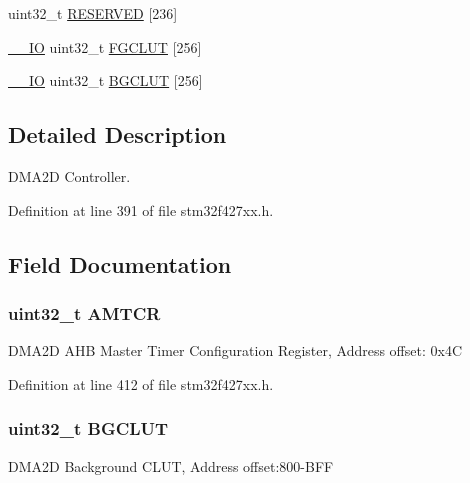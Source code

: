 \begin{DoxyCompactItemize}
\item 
uint32\+\_\+t \hyperlink{struct_d_m_a2_d___type_def_a76f04b864709f67a7c16434b41ec7ea8}{R\+E\+S\+E\+R\+V\+ED} \mbox{[}236\mbox{]}
\item 
\hyperlink{core__sc300_8h_aec43007d9998a0a0e01faede4133d6be}{\+\_\+\+\_\+\+IO} uint32\+\_\+t \hyperlink{struct_d_m_a2_d___type_def_aa263c42ff3097bde6c0d4061ac0d8e43}{F\+G\+C\+L\+UT} \mbox{[}256\mbox{]}
\item 
\hyperlink{core__sc300_8h_aec43007d9998a0a0e01faede4133d6be}{\+\_\+\+\_\+\+IO} uint32\+\_\+t \hyperlink{struct_d_m_a2_d___type_def_aa30a12d8e79ac9d4ff173a8dd6135b3c}{B\+G\+C\+L\+UT} \mbox{[}256\mbox{]}
\end{DoxyCompactItemize}


\subsection{Detailed Description}
D\+M\+A2D Controller. 

Definition at line 391 of file stm32f427xx.\+h.



\subsection{Field Documentation}
\subsubsection[{\texorpdfstring{A\+M\+T\+CR}{AMTCR}}]{ uint32\+\_\+t A\+M\+T\+CR}\hypertarget{struct_d_m_a2_d___type_def_a9f16d1904f085dbd51466994f01bd9e2}{}\label{struct_d_m_a2_d___type_def_a9f16d1904f085dbd51466994f01bd9e2}
D\+M\+A2D A\+HB Master Timer Configuration Register, Address offset\+: 0x4C 

Definition at line 412 of file stm32f427xx.\+h.

\subsubsection[{\texorpdfstring{B\+G\+C\+L\+UT}{BGCLUT}}]{ uint32\+\_\+t B\+G\+C\+L\+UT}\hypertarget{struct_d_m_a2_d___type_def_aa30a12d8e79ac9d4ff173a8dd6135b3c}{}\label{struct_d_m_a2_d___type_def_aa30a12d8e79ac9d4ff173a8dd6135b3c}
D\+M\+A2D Background C\+L\+UT, Address offset\+:800-\/\+B\+FF 

